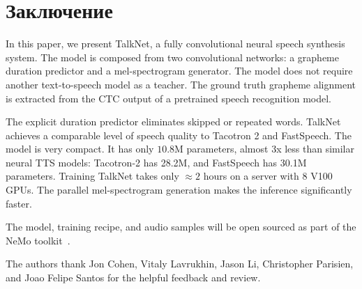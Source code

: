 \section*{Заключение}

In this paper, we present TalkNet, a fully convolutional neural speech synthesis  system. The model is composed from two convolutional networks: a grapheme duration predictor and a mel-spectrogram generator. The model does not require another text-to-speech model as a teacher. The ground truth grapheme alignment is extracted from the CTC output of a pretrained speech recognition model.

The explicit duration predictor eliminates skipped or repeated words. TalkNet achieves a comparable level of speech quality to Tacotron 2 and FastSpeech. The model is very compact. It has only $10.8$M parameters, almost 3x less than similar neural TTS models: Tacotron-2 has 28.2M, and FastSpeech has 30.1M parameters. Training TalkNet takes only $\approx 2$ hours on a server with 8 V100 GPUs. The parallel mel-spectrogram generation makes the inference significantly faster.

The model, training recipe, and audio samples will be open sourced as part of the NeMo toolkit~\cite{nemo}.

The authors thank Jon Cohen, Vitaly Lavrukhin, Jason Li, Christopher Parisien, and Joao Felipe Santos for the helpful feedback and review. 